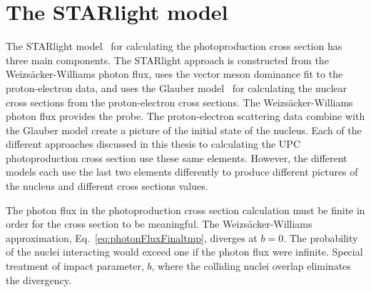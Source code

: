   \section{\label{sec:vdmTheory}The STARlight model}
    The STARlight model~\cite{vmd1999,starlight} for calculating the \JPsi{}
      photoproduction cross section has three main components.
    The STARlight approach is constructed from the Weizs\"{a}cker-Williams 
      photon flux, uses the vector meson dominance fit to the proton-electron data, 
      and uses the Glauber model~\cite{Miller:2007ri} for calculating the nuclear cross sections from 
      the proton-electron cross sections.
    The Weizs\"{a}cker-Williams photon flux provides the probe. 
    The proton-electron scattering data combine with the Glauber model  
      create a picture of the initial state of the nucleus. 
    Each of the different approaches discussed in this thesis to calculating 
      the UPC \JPsi{}  photoproduction cross section use these same elements.
    However, the different models each use the last two elements differently 
      to produce different pictures of the nucleus and different cross 
      sections values. 

    The photon flux in the photoproduction cross section calculation must be 
      finite in order for the cross section to be meaningful.
    The Weizs\"{a}cker-Williams approximation, Eq.~\ref{eq:photonFluxFinaltmp}, 
      diverges at $b=0$.
    The probability of the nuclei interacting would exceed one if the photon 
      flux were infinite. 
    Special treatment of impact parameter, $b$, where the colliding nuclei 
      overlap eliminates the divergency. 
    
